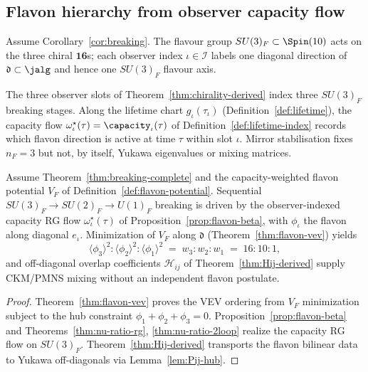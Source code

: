 \subsection{Flavon hierarchy from observer capacity flow}
\label{sec:physics:flavon}

Assume Corollary~\ref{cor:breaking}. The flavour group
$SU(3)_F\subset\Spin(10)$ acts on the three chiral $\mathbf{16}$s; each
observer index $\iota\in\mathcal{I}$ labels one diagonal direction of
$\mathfrak{d}\subset\jalg$ and hence one $SU(3)_F$ flavour axis.

\begin{proposition}\label{prop:flavon-sector}
The three observer slots of Theorem~\ref{thm:chirality-derived} index three
$SU(3)_F$ breaking stages. Along the lifetime chart $g_\iota(\tau_\iota)$
(Definition~\ref{def:lifetime}), the capacity flow
$\omega^\star_\iota(\tau)=\capacity_\iota(\tau)$ of
Definition~\ref{def:lifetime-index} records which flavon direction is active at
time $\tau$ within slot $\iota$. Mirror stabilisation fixes $n_F=3$ but not,
by itself, Yukawa eigenvalues or mixing matrices.
\end{proposition}

\begin{theorem}\label{thm:flavon-hierarchy}
Assume Theorem~\ref{thm:breaking-complete} and the capacity-weighted flavon
potential $V_F$ of Definition~\ref{def:flavon-potential}. Sequential
$SU(3)_F\to SU(2)_F\to U(1)_F$ breaking is driven by the observer-indexed
capacity RG flow $\omega^\star_\iota(\tau)$ of
Proposition~\ref{prop:flavon-beta}, with $\phi_\iota$ the flavon along
diagonal $e_\iota$. Minimization of $V_F$ along $\mathfrak{d}$
(Theorem~\ref{thm:flavon-vev}) yields
\begin{equation}\label{eq:flavon-hierarchy-vev}
  \langle\phi_3\rangle^2 : \langle\phi_2\rangle^2 : \langle\phi_1\rangle^2
  \;=\;
  w_3 : w_2 : w_1
  \;=\;
  16 : 10 : 1,
\end{equation}
and off-diagonal overlap coefficients $\mathcal{H}_{ij}$ of
Theorem~\ref{thm:Hij-derived} supply CKM/PMNS mixing without an independent
flavon postulate.
\end{theorem}

\begin{proof}
Theorem~\ref{thm:flavon-vev} proves the VEV ordering from $V_F$ minimization
subject to the hub constraint $\phi_1+\phi_2+\phi_3=0$.
Proposition~\ref{prop:flavon-beta} and Theorems~\ref{thm:nu-ratio-rg},
\ref{thm:nu-ratio-2loop} realize the capacity RG flow on $SU(3)_F$.
Theorem~\ref{thm:Hij-derived} transports the flavon bilinear data to Yukawa
off-diagonals via Lemma~\ref{lem:Pij-hub}.
\end{proof}